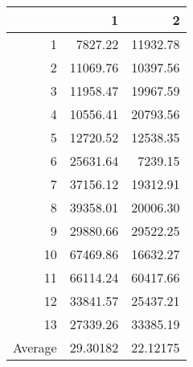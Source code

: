 \begin{table}[ht]
\centering
\begin{tabular}{rrr}
  \hline
 & 1 & 2 \\ 
  \hline
1 & 7827.22 & 11932.78 \\ 
  2 & 11069.76 & 10397.56 \\ 
  3 & 11958.47 & 19967.59 \\ 
  4 & 10556.41 & 20793.56 \\ 
  5 & 12720.52 & 12538.35 \\ 
  6 & 25631.64 & 7239.15 \\ 
  7 & 37156.12 & 19312.91 \\ 
  8 & 39358.01 & 20006.30 \\ 
  9 & 29880.66 & 29522.25 \\ 
  10 & 67469.86 & 16632.27 \\ 
  11 & 66114.24 & 60417.66 \\ 
  12 & 33841.57 & 25437.21 \\ 
  13 & 27339.26 & 33385.19 \\ 
   \hline
   Average & 29.30182 & 22.12175
\end{tabular}
\end{table}
